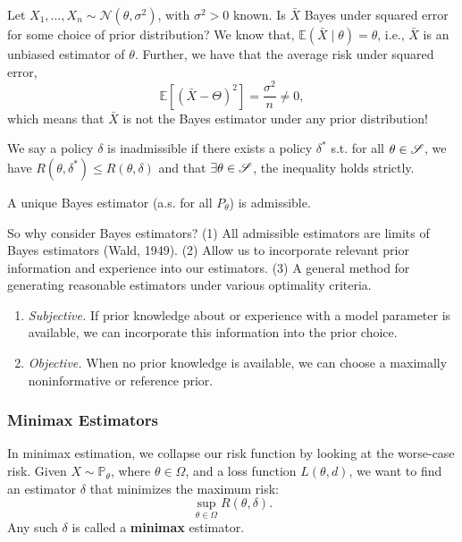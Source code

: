 \begin{exam}
Let $X_1, \ldots, X_n \sim \mathcal{N}(\theta, \sigma^2)$, with $\sigma^2 > 0$ known. Is $\bar{X}$ Bayes under squared error for some choice of prior distribution? We know that, $\mathbb{E}(\bar{X} \mid \theta) = \theta$, i.e., $\bar{X}$ is an unbiased estimator of $\theta$. Further, we have that the average risk under squared error,
\[
\mathbb{E}[(\bar{X} - \Theta)^2] = \frac{\sigma^2}{n} \neq 0,
\]
which means that $\bar{X}$ is not the Bayes estimator under any prior distribution!
\end{exam}

\begin{defn}[Admissible]
    We say a policy \(\delta\) is inadmissible if there exists a policy \(\delta^*\) s.t. for all \(\theta \in \mathcal{S}\), we have \(R(\theta,\delta^*)\leq R(\theta,\delta)\) and that \(\exists \theta \in \mathcal{S}\), the inequality holds strictly.
\end{defn}

\begin{thm}[Admissable]
A unique Bayes estimator (a.s. for all $P_\theta$) is admissible.
\end{thm}
\begin{rem}
    So why consider Bayes estimators? (1) All admissible estimators are limits of Bayes estimators (Wald, 1949).
    (2) Allow us to incorporate relevant prior information and experience into our estimators.
    (3) A general method for generating reasonable estimators under various optimality criteria.
\end{rem}

\begin{rem}
    \begin{enumerate}
        \item \textit{Subjective.} If prior knowledge about or experience with a model parameter is available, we can incorporate this information into the prior choice.
        \item \textit{Objective.} When no prior knowledge is available, we can choose a maximally noninformative or reference prior.
    \end{enumerate}
\end{rem}

\subsubsection{Minimax Estimators}
In minimax estimation, we collapse our risk function by looking at the worse-case risk. Given $X \sim \mathbb{P}_\theta$, where $\theta \in \Omega$, and a loss function $L(\theta, d)$, we want to find an estimator $\delta$ that minimizes the maximum risk:
\[
\sup_{\theta \in \Omega} R(\theta, \delta).
\]
Any such $\delta$ is called a \textbf{minimax} estimator.

